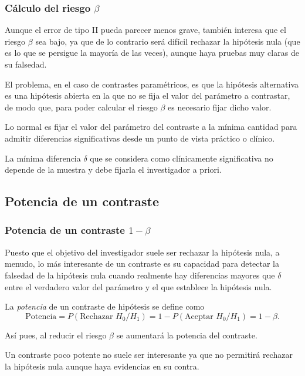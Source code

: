 \begin{frame}
\frametitle{Cálculo del riesgo $\beta$}
Aunque el error de tipo II pueda parecer menos grave, también interesa que el riesgo $\beta$ sea bajo, ya que de lo
contrario será difícil rechazar la hipótesis nula (que es lo que se persigue la mayoría de las veces),
aunque haya pruebas muy claras de su falsedad.

El problema, en el caso de contrastes paramétricos, es que la hipótesis alternativa es una hipótesis
abierta en la que no se fija el valor del parámetro a contrastar, de modo que, para poder calcular el riesgo $\beta$
es necesario fijar dicho valor.

Lo normal es fijar el valor del parámetro del contraste a la mínima cantidad para admitir diferencias
significativas desde un punto de vista práctico o clínico. 

La mínima diferencia $\delta$ que se considera como clínicamente significativa no depende de la muestra y debe fijarla
el investigador a priori.
\end{frame}


\subsection{Potencia de un contraste}
\begin{frame}
\frametitle{Potencia de un contraste $1-\beta$}
Puesto que el objetivo del investigador suele ser rechazar la hipótesis nula, a menudo, lo más interesante de un
contraste es su capacidad para detectar la falsedad de la hipótesis nula cuando realmente hay diferencias mayores que
$\delta$ entre el verdadero valor del parámetro y el que establece la hipótesis nula.

\begin{definicion}
La \emph{potencia} de un contraste de hipótesis se define como
\[
\text{Potencia} = P(\text{Rechazar }H_0/H_1) = 1 - P(\text{Aceptar }H_0/H_1) = 1-\beta.
\]
\end{definicion}

Así pues, al reducir el riesgo $\beta$ se aumentará la potencia del contraste.

Un contraste poco potente no suele ser interesante ya que no permitirá rechazar la hipótesis nula aunque haya
evidencias en su contra.
\end{frame}


